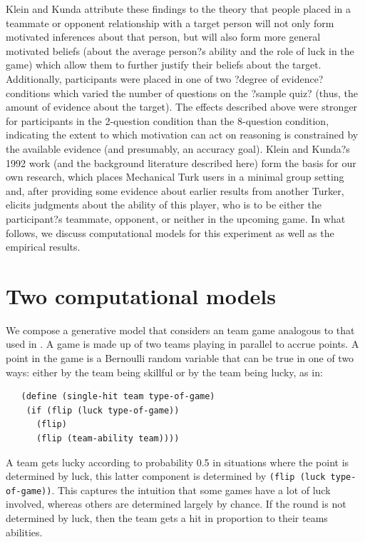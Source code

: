 \documentclass{article}
\begin{document}
Klein and Kunda attribute these findings to the theory that people placed in a teammate or opponent relationship with a target person will not only form motivated inferences about that person, but will also form more general motivated beliefs (about the average person?s ability and the role of luck in the game) which allow them to further justify their beliefs about the target. Additionally, participants were placed in one of two ?degree of evidence? conditions which varied the number of questions on the ?sample quiz? (thus, the amount of evidence about the target). The effects described above were stronger for participants in the 2-question condition than the 8-question condition, indicating the extent to which motivation can act on reasoning is constrained by the available evidence (and presumably, an accuracy goal). Klein and Kunda?s 1992 work (and the background literature described here) form the basis for our own research, which places Mechanical Turk users in a minimal group setting and, after providing some evidence about earlier results from another Turker, elicits judgments about the ability of this player, who is to be either the participant?s teammate, opponent, or neither in the upcoming game. In what follows, we discuss computational models for this experiment as well as the empirical results.

\section{Two computational models}

We compose a generative model that considers an team game analogous to that used in \citet{Klein1992}. A game is made up of two teams playing in parallel to accrue points. A point in the game is a Bernoulli random variable that can be true in one of two ways: either by the team being skillful or by the team being lucky, as in:

\begin{lstlisting}
   (define (single-hit team type-of-game)
    (if (flip (luck type-of-game)) 
      (flip) 
      (flip (team-ability team))))
\end{lstlisting}

A team gets lucky according to probability 0.5 in situations where the point is determined by luck, this latter component is determined by \lstinline{(flip (luck type-of-game))}. This captures the intuition that some games have a lot of luck involved, whereas others are determined largely by chance. If the round is not determined by luck, then the team gets a hit in proportion to their teams abilities. 
\end{document}
